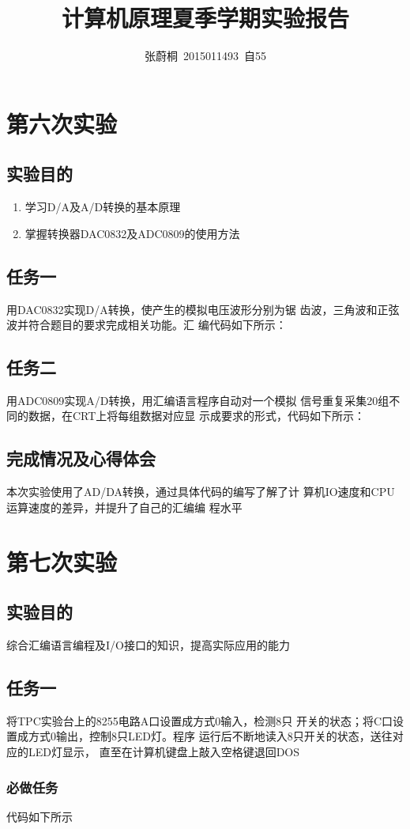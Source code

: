 \documentclass[UTF8,a4paper]{paper}
\title{计算机原理夏季学期实验报告}
\author{张蔚桐\ 2015011493\ 自55}
\begin{document}
\maketitle
\section{第六次实验}
\subsection{实验目的}
\begin{enumerate}
    \item 学习D/A及A/D转换的基本原理
    \item 掌握转换器DAC0832及ADC0809的使用方法
\end{enumerate}
\subsection{任务一}
用DAC0832实现D/A转换，使产生的模拟电压波形分别为锯
齿波，三角波和正弦波并符合题目的要求完成相关功能。汇
编代码如下所示：

\subsection{任务二}
用ADC0809实现A/D转换，用汇编语言程序自动对一个模拟
信号重复采集20组不同的数据，在CRT上将每组数据对应显
示成要求的形式，代码如下所示：

\subsection{完成情况及心得体会}
本次实验使用了AD/DA转换，通过具体代码的编写了解了计
算机IO速度和CPU运算速度的差异，并提升了自己的汇编编
程水平
\section{第七次实验}
\subsection{实验目的}
综合汇编语言编程及I/O接口的知识，提高实际应用的能力
\subsection{任务一}
将TPC实验台上的8255电路A口设置成方式0输入，检测8只
开关的状态；将C口设置成方式0输出，控制8只LED灯。程序
运行后不断地读入8只开关的状态，送往对应的LED灯显示，
直至在计算机键盘上敲入空格键退回DOS
\subsubsection{必做任务}
代码如下所示

\end{document}
